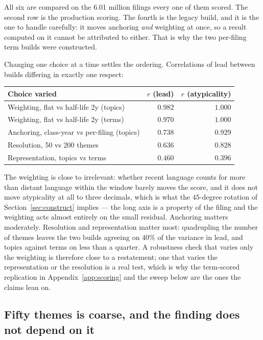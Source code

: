 \documentclass[11pt]{article}
\begin{document}
\noindent All six are compared on the 6.01 million filings every one of them
scored. The second row is the production scoring. The fourth is the legacy
build, and it is the one to handle carefully: it moves anchoring \emph{and}
weighting at once, so a result computed on it cannot be attributed to either.
That is why the two per-filing term builds were constructed.

Changing one choice at a time settles the ordering. Correlations of lead
between builds differing in exactly one respect:

\begin{center}\small
\begin{tabular}{lrr}
\toprule
Choice varied & $r$ (lead) & $r$ (atypicality) \\
\midrule
Weighting, flat vs half-life 2y (topics)  & $0.982$ & $1.000$ \\
Weighting, flat vs half-life 2y (terms)   & $0.970$ & $1.000$ \\
Anchoring, class-year vs per-filing (topics) & $0.738$ & $0.929$ \\
Resolution, 50 vs 200 themes              & $0.636$ & $0.828$ \\
Representation, topics vs terms           & $0.460$ & $0.396$ \\
\bottomrule
\end{tabular}
\end{center}

\noindent The weighting is close to irrelevant: whether recent language counts
for more than distant language within the window barely moves the score, and it
does not move atypicality at all to three decimals, which is what the
$45$-degree rotation of Section~\ref{sec:construct} implies --- the long axis is
a property of the filing and the weighting acts almost entirely on the small
residual. Anchoring matters moderately. Resolution and representation matter
most: quadrupling the number of themes leaves the two builds agreeing on 40\%
of the variance in lead, and topics against terms on less than a quarter. A
robustness check that varies only the weighting is therefore close to a
restatement; one that varies the representation or the resolution is a real
test, which is why the term-scored replication in Appendix~\ref{app:scoring}
and the sweep below are the ones the claims lean on.

\subsection{Fifty themes is coarse, and the finding does not depend on it}
\end{document}

